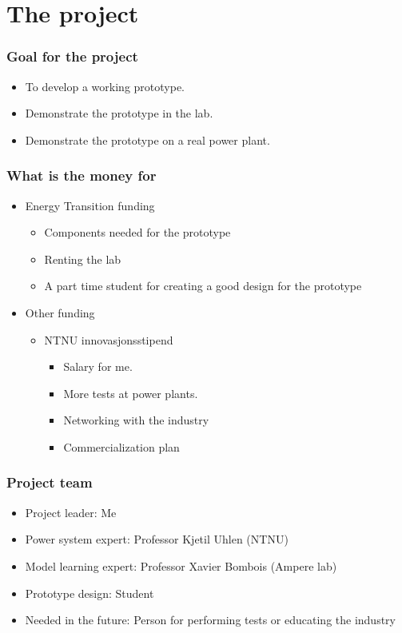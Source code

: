 \section{The project}
\begin{frame}
	\frametitle{Goal for the project}
		\begin{itemize}
		\item To develop a working prototype.
		\item Demonstrate the prototype in the lab.
		\item Demonstrate the prototype on a real power plant.
		\end{itemize}
\end{frame}
\begin{frame}
	\frametitle{What is the money for}
		\begin{itemize}
				\item Energy Transition funding
				\begin{itemize}
						\item Components needed for the prototype
						\item Renting the lab
						\item A part time student for creating a good design for the prototype
				\end{itemize}
				\item Other funding
				\begin{itemize}
					\item NTNU innovasjonsstipend
					\begin{itemize}
							\item Salary for me.
							\item More tests at power plants.
							\item Networking with the industry
							\item Commercialization plan
					\end{itemize}
				\end{itemize}
		\end{itemize}
\end{frame}
\begin{frame}
	\frametitle{Project team}
		\begin{itemize}
			\item Project leader: Me
			\item Power system expert: Professor Kjetil Uhlen (NTNU)
			\item Model learning expert: Professor Xavier Bombois (Ampere lab)
			\item Prototype design: Student
			\item Needed in the future: Person for performing tests or educating the industry
		\end{itemize}
\end{frame}

